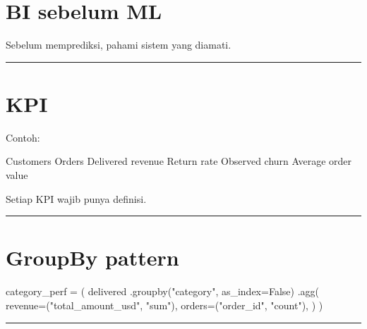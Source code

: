 \documentclass[
  indonesian,
  letterpaper,
  DIV=11,
  numbers=noendperiod]{scrreprt}
\newenvironment{Shaded}{\begin{snugshade}}{\end{snugshade}}
\newcommand{\NormalTok}[1]{\textcolor[rgb]{0.00,0.23,0.31}{#1}}
\newcommand{\OperatorTok}[1]{\textcolor[rgb]{0.37,0.37,0.37}{#1}}
\newcommand{\StringTok}[1]{\textcolor[rgb]{0.13,0.47,0.30}{#1}}
\newcommand{\VariableTok}[1]{\textcolor[rgb]{0.07,0.07,0.07}{#1}}
\begin{document}
\section{BI sebelum ML}\label{bi-sebelum-ml}

Sebelum memprediksi, pahami sistem yang diamati.

\begin{center}\rule{0.5\linewidth}{0.5pt}\end{center}

\section{KPI}\label{kpi}

Contoh:

\begin{Shaded}
\begin{Highlighting}[]
\NormalTok{Customers}
\NormalTok{Orders}
\NormalTok{Delivered revenue}
\NormalTok{Return rate}
\NormalTok{Observed churn}
\NormalTok{Average order value}
\end{Highlighting}
\end{Shaded}

Setiap KPI wajib punya definisi.

\begin{center}\rule{0.5\linewidth}{0.5pt}\end{center}

\section{GroupBy pattern}\label{groupby-pattern}

\begin{Shaded}
\begin{Highlighting}[]
\NormalTok{category\_perf }\OperatorTok{=}\NormalTok{ (}
\NormalTok{    delivered}
\NormalTok{    .groupby(}\StringTok{"category"}\NormalTok{, as\_index}\OperatorTok{=}\VariableTok{False}\NormalTok{)}
\NormalTok{    .agg(}
\NormalTok{        revenue}\OperatorTok{=}\NormalTok{(}\StringTok{"total\_amount\_usd"}\NormalTok{, }\StringTok{"sum"}\NormalTok{),}
\NormalTok{        orders}\OperatorTok{=}\NormalTok{(}\StringTok{"order\_id"}\NormalTok{, }\StringTok{"count"}\NormalTok{),}
\NormalTok{    )}
\NormalTok{)}
\end{Highlighting}
\end{Shaded}

\begin{center}\rule{0.5\linewidth}{0.5pt}\end{center}
\end{document}
